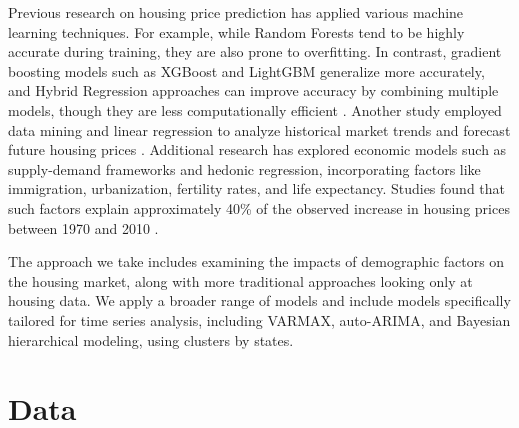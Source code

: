 \documentclass[11pt]{amsart}
\begin{document}

Previous research on housing price prediction has applied various machine learning techniques.
For example, while Random Forests tend to be highly accurate during training, they are also prone to overfitting.
In contrast, gradient boosting models such as XGBoost and LightGBM generalize more accurately, and Hybrid Regression approaches can improve accuracy by combining multiple models, though they are less computationally efficient \cite{TRUONG2020433}. 
Another study employed data mining and linear regression to analyze historical market trends and forecast future housing prices \cite{Bhagat2016}. 
Additional research has explored economic models such as supply-demand frameworks and hedonic regression, incorporating factors like immigration, urbanization, fertility rates, and life expectancy.
Studies found that such factors explain approximately 40\% of the observed increase in housing prices between 1970 and 2010 \cite{GONG2022103734}. 

The approach we take includes examining the impacts of demographic factors on the housing market, along with more traditional approaches looking only at housing data.
We apply a broader range of models and include models specifically tailored for time series analysis, including VARMAX, auto-ARIMA, and Bayesian hierarchical modeling, using clusters by states.
 

\section{Data} 
\end{document}
